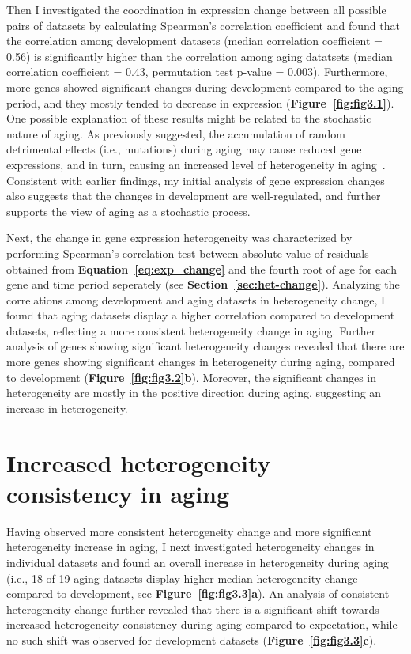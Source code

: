 Then I investigated the coordination in expression change between all possible pairs of datasets by calculating Spearman's correlation coefficient 
and found that the correlation among development datasets (median correlation coefficient = 0.56) 
is significantly higher than the correlation among aging datatsets (median correlation coefficient = 0.43, permutation test p-value = 0.003).
Furthermore, more genes showed significant changes during development compared to the aging period, and they mostly tended to decrease in expression (\textbf{Figure~\ref{fig:fig3.1}}).
One possible explanation of these results might be related to the stochastic nature of aging. 
As previously suggested, the accumulation of random detrimental effects (i.e., mutations) during aging may cause reduced gene expressions, 
and in turn, causing an increased level of heterogeneity in aging~\cite{Lu2004}.
Consistent with earlier findings, my initial analysis of gene expression changes also suggests that the changes in development are well-regulated,
and further supports the view of aging as a stochastic process.

Next, the change in gene expression heterogeneity was characterized 
by performing Spearman's correlation test between absolute value of residuals obtained from \textbf{Equation~\ref{eq:exp_change}} 
and the fourth root of age for each gene and time period seperately (see \textbf{Section~\ref{sec:het-change}}).
Analyzing the correlations among development and aging datasets in heterogeneity change,
I found that aging datasets display a higher correlation compared to development datasets, 
reflecting a more consistent heterogeneity change in aging.
Further analysis of genes showing significant heterogeneity changes revealed that 
there are more genes showing significant changes in heterogeneity during aging, compared to development (\textbf{Figure~\ref{fig:fig3.2}b}). 
Moreover, the significant changes in heterogeneity are mostly in the positive direction during aging, suggesting an increase in heterogeneity.

\section{Increased heterogeneity consistency in aging}
Having observed more consistent heterogeneity change and more significant heterogeneity increase in aging, 
I next investigated heterogeneity changes in individual datasets and found an overall increase in heterogeneity during aging 
(i.e., 18 of 19 aging datasets display higher median heterogeneity change compared to development, see \textbf{Figure~\ref{fig:fig3.3}a}). 
An analysis of consistent heterogeneity change further revealed that there is a significant shift towards increased heterogeneity consistency during aging compared to expectation,
while no such shift was observed for development datasets (\textbf{Figure~\ref{fig:fig3.3}c}).

